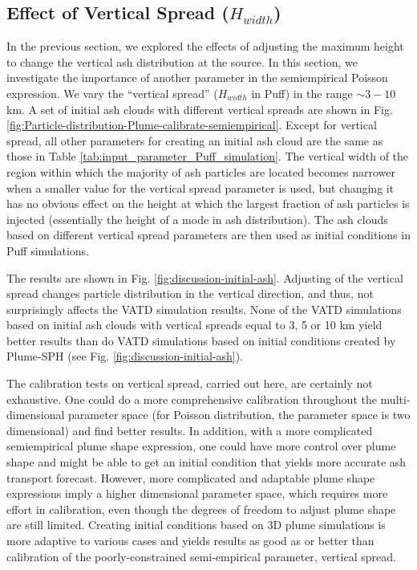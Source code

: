 \documentclass[utf8]{frontiersSCNS} %
\begin{document}
\subsection{Effect of Vertical Spread ($H_{width}$)}
In the previous section, we explored the effects of adjusting the maximum height to change the vertical ash distribution at the source. In this section, we investigate the importance of another parameter in the semiempirical Poisson expression. We vary the ``vertical spread'' ($H_{width}$ in Puff) in the range $\sim 3 - 10$ km. A set of initial ash clouds  with different vertical spreads are shown in Fig. \ref{fig:Particle-distribution-Plume-calibrate-semiempirical}. Except for vertical spread, all other parameters for creating an initial ash cloud are the same as those in Table \ref{tab:input_parameter_Puff_simulation}. The vertical width of the region within which the majority of ash particles are located becomes narrower when a smaller value for the vertical spread parameter is used, but changing it has no obvious effect on the height at which the largest fraction of ash particles is injected (essentially the height of a mode in ash distribution). The ash clouds based on different vertical spread parameters are then used as initial conditions in Puff simulations.

The results are shown in Fig. \ref{fig:discussion-initial-ash}.  Adjusting of the vertical spread changes particle distribution in the vertical direction, and thus, not surprisingly affects the VATD simulation results. None of the VATD simulations based on initial ash clouds with vertical spreads equal to 3, 5 or 10 km yield better results than do VATD simulations based on initial conditions created by Plume-SPH (see Fig. \ref{fig:discussion-initial-ash}).

The calibration tests on vertical spread, carried out here, are certainly not exhaustive. One could do a more comprehensive calibration throughout the multi-dimensional parameter space (for Poisson distribution, the parameter space is two dimensional) and find better results. In addition, with a more complicated semiempirical plume shape expression, one could have more control over plume shape and might be able to get an initial condition that yields more accurate ash transport forecast. However, more complicated and adaptable plume shape expressions imply a higher dimensional parameter space, which requires more effort in calibration, even though the degrees of freedom to adjust plume shape are still limited.  Creating initial conditions based on 3D plume simulations is more adaptive to various cases and yields results as good as or better than calibration of the poorly-constrained semi-empirical parameter, vertical spread.
\end{document}
